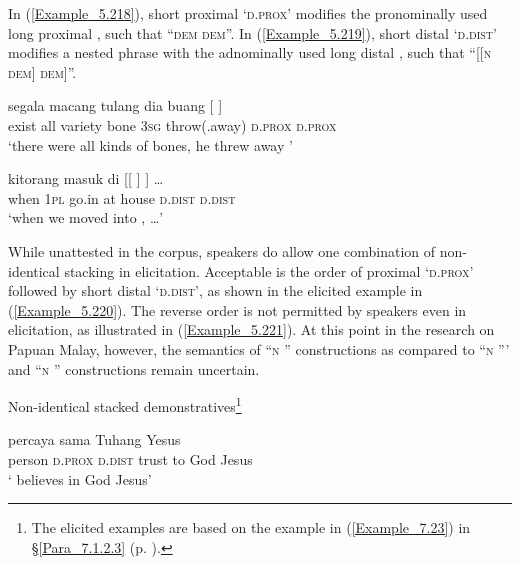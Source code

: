 In (\ref{Example_5.218}), short proximal  ‘\textsc{d.prox}’ modifies the pronominally used long proximal , such that ``\textsc{dem} \textsc{dem}''. In (\ref{Example_5.219}), short distal  ‘\textsc{d.dist}’ modifies a nested  phrase with the adnominally used long distal , such that ``[[\textsc{n} \textsc{dem}] \textsc{dem}]''.


\ea
\label{Example_5.218}
 {segala} {macang} {tulang} {dia} {buang} {[} {]}\\ %
 exist  all  variety  bone  \textsc{3sg}  throw(.away)  \textsc{d.prox}  \textsc{d.prox}\\
\glt 
‘there were all kinds of bones, he threw away ’ \textstyleExampleSource{[080922-010a-CvNF.0101]}
\z

\ea
\label{Example_5.219}
 {kitorang} {masuk} {di} {[[} {]} {]} {{\ldots}}\\ %
 when  \textsc{1pl}  go.in  at  house  \textsc{d.dist}  \textsc{d.dist}  \\
\glt 
‘when we moved into , {\ldots}’ \textstyleExampleSource{[081006-022-CvEx.0167]}
\z



While unattested in the corpus, speakers do allow one combination of non-identical  stacking in elicitation. Acceptable is the order of proximal  ‘\textsc{d.prox}’ followed by short distal  ‘\textsc{d.dist}’, as shown in the elicited example in (\ref{Example_5.220}). The reverse order is not permitted by speakers even in elicitation, as illustrated in (\ref{Example_5.221}). At this point in the research on Papuan Malay, however, the semantics of ``\textsc{n} '' constructions as compared to ``\textsc{n} ''' and ``\textsc{n} '' constructions remain uncertain.


\begin{styleExampleTitle}
Non-identical stacked demonstratives\footnote{The elicited examples are based on the example in (\ref{Example_7.23}) in §\ref{Para_7.1.2.3} (p. \pageref{Example_7.23}).}
\end{styleExampleTitle}

\ea
\label{Example_5.220}
 {} {} {percaya} {sama} {Tuhang} {Yesus}\\ %
 person  \textsc{d.prox}  \textsc{d.dist}  trust  to  God  Jesus\\
\glt 
‘ believes in God Jesus’ \textstyleExampleSource{[Elicited BR111017.009]}
\z

